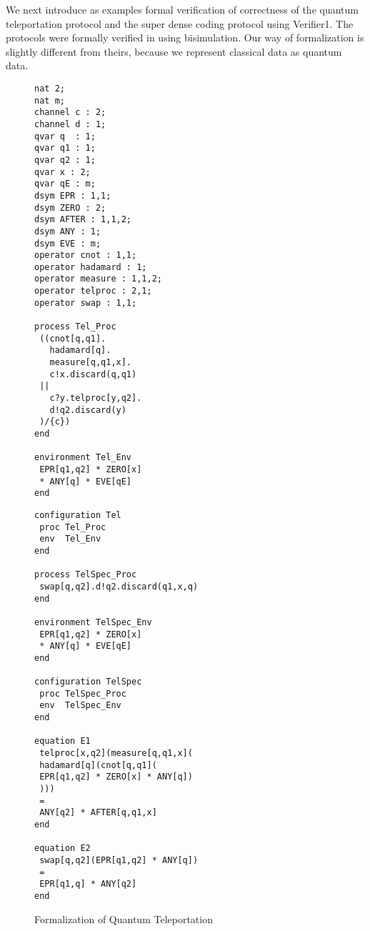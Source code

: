 We next introduce as examples formal verification of correctness of
the quantum teleportation protocol and the super dense coding
protocol using Verifier1. The protocols were formally verified in
\cite{FengDuanYing2011} using bisimulation. Our way of formalization
is slightly different from theirs, because we represent classical data
as quantum data.
\begin{figure}
\begin{minipage}{0.5\hsize}
\begin{verbatim}
nat 2;
nat m;
channel c : 2;
channel d : 1;
qvar q  : 1;
qvar q1 : 1;
qvar q2 : 1;
qvar x : 2;
qvar qE : m;
dsym EPR : 1,1;
dsym ZERO : 2;
dsym AFTER : 1,1,2;
dsym ANY : 1;
dsym EVE : m;
operator cnot : 1,1;
operator hadamard : 1;
operator measure : 1,1,2;
operator telproc : 2,1;
operator swap : 1,1;

process Tel_Proc
 ((cnot[q,q1].
   hadamard[q].
   measure[q,q1,x].
   c!x.discard(q,q1)
 ||
   c?y.telproc[y,q2].
   d!q2.discard(y)
 )/{c})
end

environment Tel_Env
 EPR[q1,q2] * ZERO[x]
 * ANY[q] * EVE[qE]
end
\end{verbatim}
\end{minipage}
\begin{minipage}{0.5\hsize}
\begin{verbatim}
configuration Tel
 proc Tel_Proc
 env  Tel_Env
end

process TelSpec_Proc
 swap[q,q2].d!q2.discard(q1,x,q)
end

environment TelSpec_Env
 EPR[q1,q2] * ZERO[x]
 * ANY[q] * EVE[qE]
end

configuration TelSpec
 proc TelSpec_Proc
 env  TelSpec_Env
end

equation E1
 telproc[x,q2](measure[q,q1,x](
 hadamard[q](cnot[q,q1](
 EPR[q1,q2] * ZERO[x] * ANY[q])
 )))
 = 
 ANY[q2] * AFTER[q,q1,x]
end

equation E2
 swap[q,q2](EPR[q1,q2] * ANY[q])
 =
 EPR[q1,q] * ANY[q2]
end
\end{verbatim}
\end{minipage}
\caption{Formalization of Quantum Teleportation}
\label{fml:codetel}
\end{figure}

